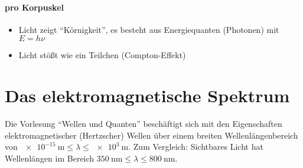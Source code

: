 \paragraph{pro Korpuskel}
\begin{itemize}
	\item Licht zeigt \enquote{Körnigkeit}, 
      es besteht aus Energiequanten (Photonen) mit $E=h\nu$
	\item Licht stößt wie ein Teilchen (Compton-Effekt)
\end{itemize}

\section{Das elektromagnetische Spektrum}
Die Vorlesung \enquote{Wellen und Quanten} beschäftigt sich mit den
Eigenschaften elektromagnetischer (Hertzscher) Wellen über einem breiten
Wellenlängenbereich von
$\SI{e-15}{\m} \leq \lambda\leq \SI{e3}{\m}$.
Zum Vergleich: Sichtbares Licht hat Wellenlängen im Bereich
$\SI{350}{\nano\m} \leq \lambda \leq \SI{800}{\nano\m}$.


